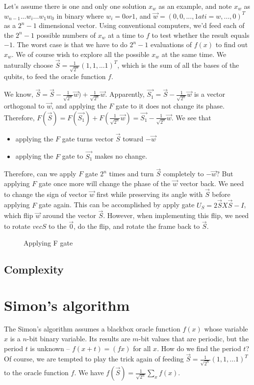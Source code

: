 \documentclass[oneside, letter, 12pt]{book}
\begin{document}
Let's assume there is one and only one solution $x_w$ as an example, and note $x_w$ as $w_{n-1}...w_i...w_1 w_0$ in binary where $w_i = 0 or 1$, and $\Vec{w} = (0, 0, ..., 1 at i=w, ..., 0)^T$ as a $2^n-1$ dimensional vector. Using conventional computers, we'd feed each of the $2^n -1$ possible numbers of $x_w$ at a time to $f$ to test whether the result equals $-1$. The worst case is that we have to do $2^n-1$ evaluations of $f(x)$ to find out $x_w$. We of course wish to explore all the possible $x_w$ at the same time. We naturally choose $\vec{S} = \frac 1 {\sqrt{2^n}} (1, 1, ...1)^T$, which is the sum of all the bases of the qubits, to feed the oracle function $f$.

We know, $\vec{S} = \vec{S} - \frac 1 {\sqrt{2^n}} \vec{w}) + \frac 1  {\sqrt{2^n}} \vec{w}$. Apparently, $\vec{S_1}  = \vec{S} - \frac 1 {\sqrt{2^n}} \vec{w}$ is a vector orthogonal to $\vec{w}$, and applying the $F$ gate to it does not change its phase. Therefore, $F(\vec{S}) = F(\vec{S_1}) + F(\frac 1  {\sqrt{2^n}} \vec{w})  = \vec{S_1} - \frac 1 {\sqrt{2^n}} \vec{w}$. We see that 
\begin{itemize}
    \item applying the $F$ gate turns vector $\vec{S}$ toward $-\vec{w}$
    \item applying the $F$ gate to $\vec{S_1}$ makes no change.
\end{itemize}
Therefore, can we apply $F$ gate $2^n$ times and turn $\vec{S}$ completely to $-\vec{w}$? But applying $F$ gate once more will change the phase of the $\vec{w}$ vector back. We need to change the sign of vector $\vec{w}$ first while preserving its angle with $\vec{S}$ before applying $F$ gate again. This can be accomplished by apply gate $U_S = 2 \vec{S}X\vec{S} -I$, which flip $\vec{w}$ around the vector $\vec{S}$. However, when implementing this flip, we need to rotate $vec{S}$ to the $\vec{0}$, do the flip, and rotate the frame back to $\vec{S}$.

\begin{figure}[h]\label{Grover}

\caption{Applying F gate}
\end{figure}

\subsection{Complexity}

\section{Simon's algorithm}
The Simon's algorithm assumes a blackbox oracle function $f(x)$ whose variable $x$ is a $n$-bit binary variable. Its results are $m$-bit values that are periodic, but the period $t$ is unknown -- $f(x+t)=(fx)$ for all $x$. How do we find the period $t$? Of course, we are tempted to play the trick again of feeding $\vec{S} = \frac 1 {\sqrt{2^n}} (1, 1, ...1)^T$ to the oracle function $f$. We have
$f(\vec{S}) = \frac 1  {\sqrt{2^n}} \sum_x f(x)$.
\end{document}
